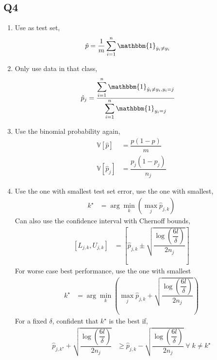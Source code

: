 \documentclass{article}
\begin{document}
\subsection{Q4}
\begin{enumerate}
\item Use as test set,
\begin{align*}
\hat{p} &= \dfrac{1}{m} \displaystyle\sum_{i=1}^{n} \mathbbm{1}_{\hat{y}_{i} \neq  y_{i}}
\end{align*}
\item Only use data in that class,
\begin{align*}
\hat{p}_{j} &= \dfrac{\displaystyle\sum_{i=1}^{n} \mathbbm{1}_{\hat{y}_{i} \neq  y_{i}, y_{i} = j}}{\displaystyle\sum_{i=1}^{n} \mathbbm{1}_{y_{i} = j}}
\end{align*}
\item Use the binomial probability again,
\begin{align*}
\mathbb{V}\left[\hat{p}\right] &= \dfrac{p \left(1 - p\right)}{m}
\\ \mathbb{V}\left[\hat{p}_{j}\right] &= \dfrac{p_{j} \left(1 - p_{j}\right)}{n_{j}}
\end{align*}
\item Use the one with smallest test set error, use the one with smallest,
\begin{align*}
k^\star  &= \arg\displaystyle\min_{k} \left(\displaystyle\max_{j} \hat{p}_{j,k}\right)
\end{align*}
Can also use the confidence interval with Chernoff bounds,
\begin{align*}
\left[L_{j,k} , U_{j,k}\right] &= \left[\hat{p}_{j,k} \pm \sqrt{\dfrac{\log\left(\dfrac{6 l}{\delta}\right)}{2 n_{j}}}\right]
\end{align*}
For worse case best performance, use the one with smallest
\begin{align*}
k^\star  &= \arg\displaystyle\min_{k} \left(\displaystyle\max_{j} \hat{p}_{j,k} + \sqrt{\dfrac{\log\left(\dfrac{6 l}{\delta}\right)}{2 n_{j}}}\right)
\end{align*}
For a fixed $\delta$, confident that $k^\star $ is the best if,
\begin{align*}
\hat{p}_{j,k^\star } + \sqrt{\dfrac{\log\left(\dfrac{6 l}{\delta}\right)}{2 n_{j}}} &\geq  \hat{p}_{j,k} - \sqrt{\dfrac{\log\left(\dfrac{6 l}{\delta}\right)}{2 n_{j}}} \;\forall\; k \neq  k^\star 
\end{align*}

\end{enumerate}
\end{document}
